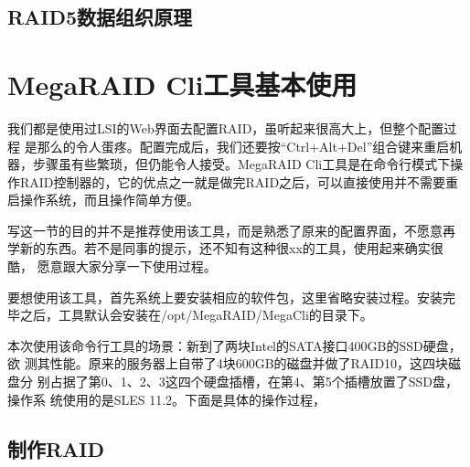 \subsection{RAID5数据组织原理}

\section{MegaRAID Cli工具基本使用}
\label{sec:MegaraidCmd}

我们都是使用过LSI的Web界面去配置RAID，虽听起来很高大上，但整个配置过程
是那么的令人蛋疼。配置完成后，我们还要按“Ctrl+Alt+Del”组合键来重启机
器，步骤虽有些繁琐，但仍能令人接受。MegaRAID Cli工具是在命令行模式下操
作RAID控制器的，它的优点之一就是做完RAID之后，可以直接使用并不需要重
启操作系统，而且操作简单方便。

写这一节的目的并不是推荐使用该工具，而是熟悉了原来的配置界面，不愿意再
学新的东西。若不是同事的提示，还不知有这种很xx的工具，使用起来确实很酷，
愿意跟大家分享一下使用过程。

要想使用该工具，首先系统上要安装相应的软件包，这里省略安装过程。安装完
毕之后，工具默认会安装在/opt/MegaRAID/MegaCli的目录下。

本次使用该命令行工具的场景：新到了两块Intel的SATA接口400GB的SSD硬盘，欲
测其性能。原来的服务器上自带了4块600GB的磁盘并做了RAID10，这四块磁盘分
别占据了第0、1、2、3这四个硬盘插槽，在第4、第5个插槽放置了SSD盘，操作系
统使用的是SLES 11.2。下面是具体的操作过程，

\subsection{制作RAID}

